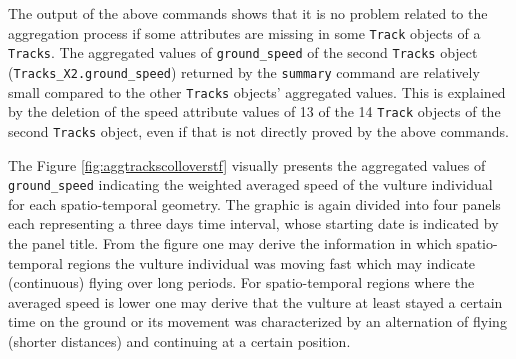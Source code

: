 \documentclass[12pt, oneside, a4paper]{scrbook}
\let\code=\texttt
\begin{document}
\par\medskip

The output of the above commands shows that it is no problem related to the aggregation process if some attributes are missing in some \code{Track} objects of a \code{Tracks}. 
The aggregated values of \code{ground\_speed} of the second \code{Tracks} object (\code{Tracks\_X2.ground\_speed}) returned by the \code{summary} command are relatively small compared to the other \code{Tracks} objects' aggregated values.
This is explained by the deletion of the speed attribute values of 13 of the 14 \code{Track} objects of the second \code{Tracks} object, even if that is not directly proved by the above commands.
\par\medskip

The Figure \ref{fig:aggtrackscolloverstf} visually presents the aggregated values of \code{ground\_speed} indicating the weighted averaged speed of the vulture individual for each spatio-temporal geometry. The graphic is again divided into four panels each representing a three days time interval, whose starting date is indicated by the panel title.
From the figure one may derive the information in which spatio-temporal regions the vulture individual was moving fast which may indicate (continuous) flying over long periods.
For spatio-temporal regions where the averaged speed is lower one may derive that the vulture at least stayed a certain time on the ground or its movement was characterized by an alternation of flying (shorter distances) and continuing at a certain position.
\par\medskip
\end{document}
